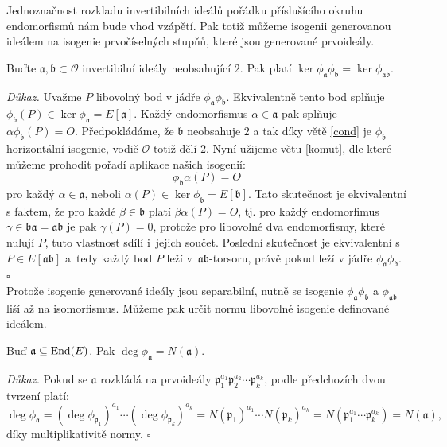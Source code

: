 \documentclass[12pt]{report}
\begin{document}
Jednoznačnost rozkladu invertibilních ideálů pořádku příslušícího okruhu endomorfismů nám bude vhod vzápětí. Pak totiž můžeme isogenii generovanou ideálem na isogenie prvočíselných stupňů, které jsou generované prvoideály.

\begin{veta}\label{multivitamin}
Buďte $\mathfrak{a},\mathfrak{b} \subset \mathcal{O}$ invertibilní ideály neobsahující $2$. Pak platí $\ker \phi_\mathfrak{a} \phi_\mathfrak{b} = \ker \phi_\mathfrak{ab}$.
\end{veta}
\noindent \textit{Důkaz.} Uvažme $P$ libovolný bod v jádře $\phi_{\mathfrak{a}} \phi_{\mathfrak{b}}$. Ekvivalentně tento bod splňuje $\phi_\mathfrak{b} (P) \in \ker \phi_{\mathfrak{a}} = E[\mathfrak{a}]$. Každý endomorfismus $\alpha \in \mathfrak{a}$ pak splňuje $\alpha \phi_{\mathfrak{b}} (P) = O$. Předpokládáme, že $\mathfrak{b}$ neobsahuje $2$ a tak díky větě \ref{cond} je $\phi_{\mathfrak{b}}$ horizontální isogenie, vodič $\mathcal{O}$ totiž dělí $2$. Nyní užijeme větu \ref{komut}, dle které můžeme prohodit pořadí aplikace našich isogenií:
\begin{equation*}
\phi_{\mathfrak{b}} \alpha (P) =O
\end{equation*}
pro každý $\alpha \in \mathfrak{a}$, neboli $\alpha (P) \in \ker \phi_{\mathfrak{b}} = E[\mathfrak{b}]$.  Tato skutečnost je ekvivalentní s faktem, že pro každé $\beta \in \mathfrak{b}$ platí $\beta \alpha (P) = O$, tj. pro každý endomorfimus $\gamma \in \mathfrak{ba} = \mathfrak{ab}$ je pak $\gamma (P) = 0$, protože pro libovolné dva endomorfismy, které nulují $P$, tuto vlastnost sdílí i~jejich součet. Poslední skutečnost je ekvivalentní s $P \in E[\mathfrak{ab}]$ a~tedy každý bod $P$ leží v~$\mathfrak{ab}$-torsoru, právě pokud leží v jádře $\phi_{\mathfrak{a}} \phi_{\mathfrak{b}}$. \hfill $\square$\\

Protože isogenie generované ideály jsou separabilní, nutně se isogenie $\phi_\mathfrak{a} \phi_\mathfrak{b}$ a $\phi_{\mathfrak{ab}}$ liší až na isomorfismus. Můžeme pak určit normu libovolné isogenie definované ideálem.
\begin{dusledek}
Buď $\mathfrak{a} \subseteq \operatorname{End}(E)$. Pak $\deg \phi_{\mathfrak{a}} = N(\mathfrak{a})$.
\end{dusledek}
\noindent \textit{Důkaz.} Pokud se $\mathfrak{a}$ rozkládá na prvoideály $\mathfrak{p}_{1} ^{a_1} \mathfrak{p}_2 ^{a_2} \cdots \mathfrak{p}_{k} ^{a_k}$, podle předchozích dvou tvrzení platí: 
\begin{equation*}
\deg \phi_{\mathfrak{a}} = (\deg \phi_{\mathfrak{p}_1} )^{a_1} \cdots (\deg \phi_{\mathfrak{p}_k} )^{a_k} = N(\mathfrak{p}_1)^{a_1} \cdots N(\mathfrak{p}_k)^{a_k} = N(\mathfrak{p}_1 ^{a_1} \cdots \mathfrak{p}_k ^{a_k}) = N(\mathfrak{a}),
\end{equation*}
díky multiplikativitě normy. \hfill $\square$\\
\end{document}
